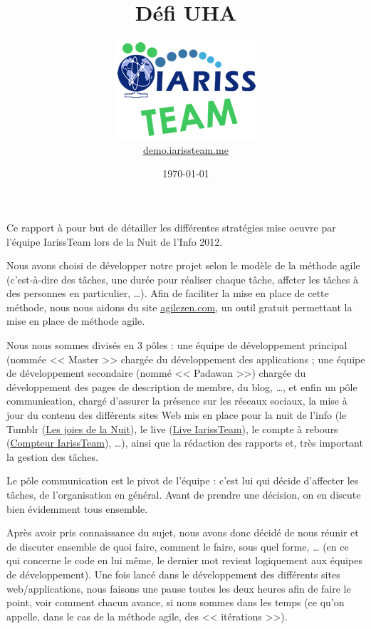 \documentclass[12pt, a4paper]{article}
\title{Défi UHA}
\newcommand{\espace}{\vspace{.8cm}}
\begin{document}
\author{\includegraphics{../_img/iariss_team.png} \\ {\sffamily \href{http://demo.iarissteam.me}{demo.iarissteam.me}}}
\date{\today}

\maketitle{}

{\sffamily Ce rapport à pour but de détailler les différentes stratégies mise oeuvre par l'équipe IarissTeam lors de la Nuit de l'Info 2012.} 

\espace{}
Nous avons choisi de développer notre projet selon le modèle de la méthode agile (c'est-à-dire des tâches, une durée pour réaliser chaque tâche, affcter les tâches à des personnes en particulier, \ldots{}). Afin de faciliter la mise en place de cette méthode, nous nous aidons du site \href{http://www.agilezen.com/}{agilezen.com}, un outil gratuit permettant la mise en place de méthode agile.

Nous nous sommes divisés en 3 pôles : une équipe de développement principal (nommée << Master >> chargée du développement des applications ; une équipe de développement secondaire (nommé << Padawan >>) chargée du développement des pages de description de membre, du blog, \ldots{},  et enfin un pôle communication, chargé d'assurer la présence sur les réseaux sociaux, la mise à jour du contenu des différents sites Web mis en place pour la nuit de l'info (le Tumblr (\href{http://lesjoiesdelanuit.tumblr.com/}{Les joies de la Nuit}), le live (\href{http://live.iarissteam.me/}{Live IarissTeam}), le compte à rebours (\href{http://iarissteam.me/}{Compteur IarissTeam}), \ldots{}), ainsi que la rédaction des rapports et, très important la gestion des tâches.

\espace{}
Le pôle communication est le pivot de l'équipe : c'est lui qui décide d'affecter les tâches, de l'organisation en général. Avant de prendre une décision, on en discute bien évidemment tous ensemble.

Après avoir pris connaissance du sujet, nous avons donc décidé de nous réunir et de discuter ensemble de quoi faire, comment le faire, sous quel forme, \ldots{} (en ce qui concerne le code en lui même, le dernier mot revient logiquement aux équipes de développement). Une fois lancé dans le développement des différents sites web/applications, nous faisons une pause toutes les deux heures afin de faire le point, voir comment chacun avance, si nous sommes dans les temps (ce qu'on appelle, dans le cas de la méthode agile, des << itérations >>).
\end{document}

